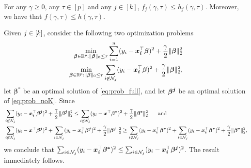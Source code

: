 \documentclass[mnsc,nonblindrev]{informs3} %
\newcommand{\ag}[1]{{\color{black}#1}}
\begin{document}
\begin{proposition}\label{prop:LB}
For any $\gamma\geq 0$, any $\tau \in[p]$ \ag{and any $j\in [k]$}, $f_j(\gamma,\tau)\leq h_j(\gamma,\tau)$. Moreover, we have that $f(\gamma, \tau) \leq h(\gamma, \tau)$.
\end{proposition}
Given ${\color{black}j}\in [k]$, consider the following two optimization problems
	\begin{align}
		\min_{\bm{\beta}\in \mathbb{R}^p: \Vert \bm{\beta}\Vert_0 \leq \tau}\sum_{i=1}^n(y_i -\bm{x_i}^\top \bm{\beta})^2+\frac{\gamma}{2}\Vert \bm{\beta}\Vert_2^2\label{eq:prob_full}\\
	\min_{\bm{\beta}\in \mathbb{R}^p: \Vert \bm{\beta}\Vert_0 \leq \tau}\sum_{\ag{i \not\in \mathcal{N}_j}}(y_i -\bm{x_i}^\top \bm{\beta})^2+\frac{\gamma}{2}\Vert \bm{\beta}\Vert_2^2,\label{eq:prob_noK}
	\end{align}
let $\bm{\beta^*}$ be an optimal solution of \eqref{eq:prob_full}, and let $\bm{\beta^{\color{black}j}}$ be an optimal solution of \eqref{eq:prob_noK}. Since \begin{align*}&\sum_{\ag{i \not\in \mathcal{N}_j}}(y_i -\bm{x_i}^\top \bm{\beta^{\color{black}j}})^2+\frac{\gamma}{2}\Vert \bm{\beta^{\color{black}j}}\Vert_2^2\leq \sum_{\ag{i \not\in \mathcal{N}_j}}(y_i -\bm{x}^\top \bm{\beta^*})^2+\frac{\gamma}{2}\Vert \bm{\beta^*}\Vert_2^2,\quad \text{ and }\\
&\sum_{\ag{i \not\in \mathcal{N}_j}}(y_i -\bm{x}^\top \bm{\beta^{\color{black}j}})^2+\ag{\sum_{i\in \mathcal{N}_j}}(y_{\color{black}i} -\bm{x_{\color{black}i}}^\top \bm{\beta^{\color{black}j}})^2+\frac{\gamma}{2}\Vert \bm{\beta^{\color{black}j}}\Vert_2^2\geq \sum_{\ag{i \not\in \mathcal{N}_j}}(y_i -\bm{x_i}^\top \bm{\beta^*})^2+\ag{\sum_{i\in \mathcal{N}_j}}(y_{\color{black}i} -\bm{x_{\color{black}i}}^\top \bm{\beta^*})^2+\frac{\gamma}{2}\Vert \bm{\beta^*}\Vert_2^2,
\end{align*}
we conclude that $\ag{\sum_{i\in \mathcal{N}_j}}(y_{\color{black}i} -\bm{x_{\color{black}i}}^\top \bm{\beta^*})^2\leq  \ag{\sum_{i\in \mathcal{N}_j}}(y_{\color{black}i} -\bm{x_{\color{black}i}}^\top \bm{\beta^{\color{black}j}})^2$. The result immediately follows. \Halmos
\endproof


\end{document}

